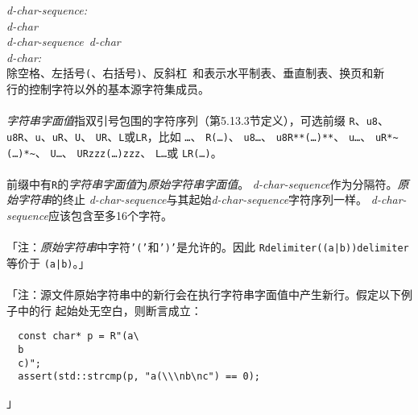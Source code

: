 \noindent \mbox{\qquad \textit{d-char-sequence:}}                             \\
\mbox{\qquad \qquad \textit{d-char}}                                          \\
\mbox{\qquad \qquad \textit{d-char-sequence d-char}}                          \\
\noindent \mbox{\qquad \textit{d-char:}}                                      \\
\mbox{\qquad \qquad 除空格、左括号\texttt{(}、右括号\texttt{)}、反斜杠
  \texttt{\bslh}和表示水平制表、垂直制表、换页和新}                           \\
\mbox{\qquad \qquad 行的控制字符以外的基本源字符集成员。}                     \\

\paragraph{}
\textit{字符串字面值}指双引号包围的字符序列（第5.13.3节定义），可选前缀
\texttt{R}、\texttt{u8}、\texttt{u8R}、\texttt{u}、\texttt{uR}、\texttt{U}、
\texttt{UR}、\texttt{L}或\texttt{LR}，比如
\texttt{\qdbl{}\ldots\qdbl}、
\texttt{R\qdbl{}(\ldots)\qdbl}、
\texttt{u8\qdbl{}\ldots\qdbl}、
\texttt{u8R\qdbl{}**(\ldots)**\qdbl}、
\texttt{u\qdbl{}\ldots\qdbl}、
\texttt{uR\qdbl{}*\textasciitilde(\ldots)*\textasciitilde\qdbl}、
\texttt{U\qdbl{}\ldots\qdbl}、
\texttt{UR\qdbl{}zzz(\ldots)zzz\qdbl}、
\texttt{L\qdbl{}\ldots\qdbl}或
\texttt{LR\qdbl{}(\ldots)\qdbl}。

\paragraph{}
前缀中有\texttt{R}的\textit{字符串字面值}为\textit{原始字符串字面值}。
\textit{d-char-sequence}作为分隔符。\textit{原始字符串}的终止
\textit{d-char-sequence}与其起始\textit{d-char-sequence}字符序列一样。
\textit{d-char-sequence}应该包含至多16个字符。

\paragraph{}
「注：\textit{原始字符串}中字符\texttt{'('}和\texttt{')'}是允许的。因此
\texttt{R\qdbl{}delimiter((a|b))delimiter\qdbl}等价于
\texttt{\qdbl{}(a|b)\qdbl}。」

\paragraph{}
「注：源文件原始字符串中的新行会在执行字符串字面值中产生新行。假定以下例子中的行
起始处无空白，则断言成立：
\begin{lstlisting}
  const char* p = R"(a\
  b
  c)";
  assert(std::strcmp(p, "a(\\\nb\nc") == 0);
\end{lstlisting}」

